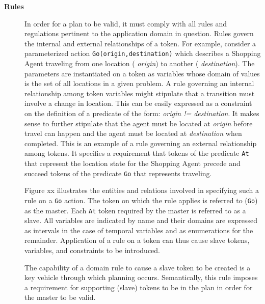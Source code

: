 \begin{description}

\item[\textbf{Rules}] In order for a plan to be valid, it must comply
  with all rules and regulations pertinent to the application domain
  in question. Rules govern the internal and external relationships of
  a token. For example, consider a parameterized action
  \texttt{Go(origin,destination)} which describes a Shopping Agent
  traveling from one location ( \textit{origin}) to another (
  \textit{destination}). The parameters are instantiated on a token as
  variables whose domain of values is the set of all locations in a
  given problem. A rule governing an internal relationship among token
  variables might stipulate that a transition must involve a change in
  location. This can be easily expressed as a constraint on the
  definition of a predicate of the form: \textit{origin !=
    destination}. It makes sense to further stipulate that the agent
  must be located at \textit{origin} before travel can happen and the
  agent must be located at \textit{destination} when completed. This
  is an example of a rule governing an external relationship among
  tokens. It specifies a requirement that tokens of the predicate
  \texttt{At} that represent the location state for the Shopping Agent
  precede and succeed tokens of the predicate \texttt{Go} that
  represents traveling.


Figure xx illustrates the entities and relations involved in
specifying such a rule on a \texttt{Go} action. The token on which the
rule applies is referred to (\texttt{Go}) as the master. Each
\texttt{At} token required by the master is referred to as a
slave. All variables are indicated by name and their domains are
expressed as intervals in the case of temporal variables and as
enumerations for the remainder. Application of a rule on a token can
thus cause slave tokens, variables, and constraints to be introduced.

The capability of a domain rule to cause a slave token to be created
is a key vehicle through which planning occurs. Semantically, this
rule imposes a requirement for supporting (slave) tokens to be in the
plan in order for the master to be valid.



\end{description}

